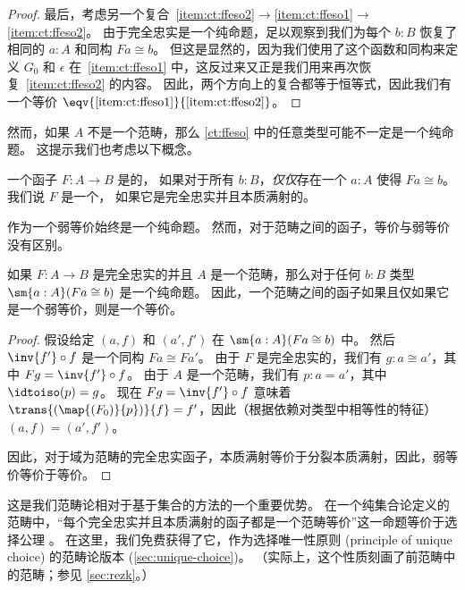 \begin{proof}
  最后，考虑另一个复合~\ref{item:ct:ffeso2}$\to$\ref{item:ct:ffeso1}$\to$\ref{item:ct:ffeso2}。
  由于完全忠实是一个纯命题，足以观察到我们为每个 $b:B$ 恢复了相同的 $a:A$ 和同构 $F a \cong b$。
  但这是显然的，因为我们使用了这个函数和同构来定义 $G_0$ 和 $\epsilon$ 在~\ref{item:ct:ffeso1} 中，这反过来又正是我们用来再次恢复~\ref{item:ct:ffeso2} 的内容。
  因此，两个方向上的复合都等于恒等式，因此我们有一个等价 $\eqv{\text{\ref{item:ct:ffeso1}}}{\text{\ref{item:ct:ffeso2}}}$。
\end{proof}

然而，如果 $A$ 不是一个范畴，那么 \cref{ct:ffeso} 中的任意类型可能不一定是一个纯命题。
这提示我们也考虑以下概念。

\begin{defn}\label{ct:essentially-surjective}
一个函子 $F:A\to B$ 是的，
%
%
如果对于所有 $b:B$，\emph{仅仅}存在一个 $a:A$ 使得 $Fa\cong b$。
我们说 $F$ 是一个，
%
%
%
如果它是完全忠实并且本质满射的。
\end{defn}

作为一个弱等价始终是一个纯命题。
然而，对于范畴之间的函子，等价与弱等价没有区别。

\begin{lem}\label{ct:catweq}
如果 $F:A\to B$ 是完全忠实的并且 $A$ 是一个范畴，那么对于任何 $b:B$ 类型 $\sm{a:A} (Fa\cong b)$ 是一个纯命题。
因此，一个范畴之间的函子如果且仅如果它是一个弱等价，则是一个等价。
\end{lem}
\begin{proof}
  假设给定 $(a,f)$ 和 $(a',f')$ 在 $\sm{a:A} (Fa\cong b)$ 中。
  然后 $\inv{f'}\circ f$ 是一个同构 $Fa \cong Fa'$。
  由于 $F$ 是完全忠实的，我们有 $g:a\cong a'$，其中 $Fg = \inv{f'}\circ f$。
  由于 $A$ 是一个范畴，我们有 $p:a=a'$，其中 $\idtoiso(p)=g$。
  现在 $Fg = \inv{f'}\circ f$ 意味着 $\trans{(\map{(F_0)}{p})}{f} = f'$，因此（根据依赖对类型中相等性的特征）$(a,f)=(a',f')$。

  因此，对于域为范畴的完全忠实函子，本质满射等价于分裂本质满射，因此，弱等价等价于等价。
\end{proof}

这是我们范畴论相对于基于集合的方法的一个重要优势。
在一个纯集合论定义的范畴中，“每个完全忠实并且本质满射的函子都是一个范畴等价”这一命题等价于选择公理 \choice{}。
在这里，我们免费获得了它，作为选择唯一性原则 (principle of unique choice) 的范畴论版本 (\cref{sec:unique-choice})。
（实际上，这个性质刻画了前范畴中的范畴；参见 \cref{sec:rezk}。）

